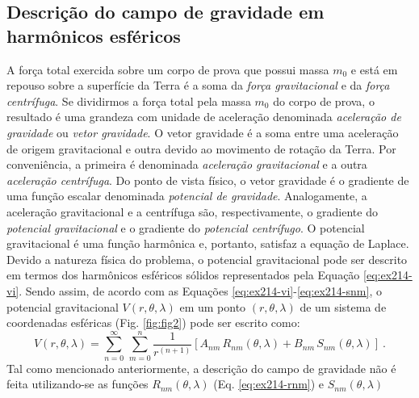 \documentclass[10pt,a4paper,fleqn]{article}
\begin{document}
\begin{flushleft}
\dotfill
\end{flushleft}

\subsection{Descri\c{c}\~{a}o do campo de gravidade em harm\^{o}nicos esf\'{e}ricos}

A for\c{c}a total exercida sobre um corpo de prova que possui massa $m_{0}$ e est\'{a} em
repouso sobre a superf\'{i}cie da Terra \'{e} a soma da \textit{for\c{c}a 
gravitacional} e da \textit{for\c{c}a centr\'{i}fuga}.
Se dividirmos a for\c{c}a total pela massa $m_{0}$ do corpo de prova, o resultado
\'{e} uma grandeza com unidade de acelera\c{c}\~{a}o denominada \textit{acelera\c{c}\~{a}o
de gravidade} ou \textit{vetor gravidade}.
O vetor gravidade \'{e} a soma entre uma acelera\c{c}\~{a}o de origem gravitacional 
e outra devido ao movimento de rota\c{c}\~{a}o da Terra. Por conveni\^{e}ncia,
a primeira \'{e} denominada \textit{acelera\c{c}\~{a}o gravitacional} e a outra 
\textit{acelera\c{c}\~{a}o centr\'{i}fuga}.
Do ponto de vista f\'{i}sico, o vetor gravidade \'{e} o gradiente de uma fun\c{c}\~{a}o
escalar denominada \textit{potencial de gravidade}. 
Analogamente, a acelera\c{c}\~{a}o gravitacional e a centr\'{i}fuga s\~{a}o, 
respectivamente, o gradiente do \textit{potencial gravitacional} e o gradiente 
do \textit{potencial centr\'{i}fugo}.
O potencial gravitacional \'{e} uma fun\c{c}\~{a}o harm\^{o}nica e, portanto,
satisfaz a equa\c{c}\~{a}o de Laplace.
Devido a natureza f\'{i}sica do problema, o potencial gravitacional pode ser descrito
em termos dos harm\^{o}nicos esf\'{e}ricos s\'{o}lidos representados pela Equa\c{c}\~{a}o 
\ref{eq:ex214-vi}. Sendo assim, de acordo com as Equa\c{c}\~{o}es 
\ref{eq:ex214-vi}-\ref{eq:ex214-snm}, o potencial gravitacional $V(r, \theta, \lambda)$
em um ponto $(r, \theta, \lambda)$ de um sistema de coordenadas esf\'{e}ricas (Fig. \ref{fig:fig2})
pode ser escrito como:
\begin{equation}
V(r, \theta, \lambda) = \sum_{n=0}^{\infty} \, \sum_{m=0}^{n} 
\frac{1}{r^{(n+1)}} \left[ 
A_{nm} \, R_{nm}(\theta, \lambda) +
B_{nm} \, S_{nm}(\theta, \lambda)
\right] \: .
\label{eq:potencial-gravitacional}
\end{equation}
Tal como mencionado anteriormente, a descri\c{c}\~{a}o do campo de gravidade 
n\~{a}o \'{e} feita utilizando-se as fun\c{c}\~{o}es 
$R_{nm}(\theta, \lambda)$ (Eq. \ref{eq:ex214-rnm}) e $S_{nm}(\theta, \lambda)$ 
\end{document}
